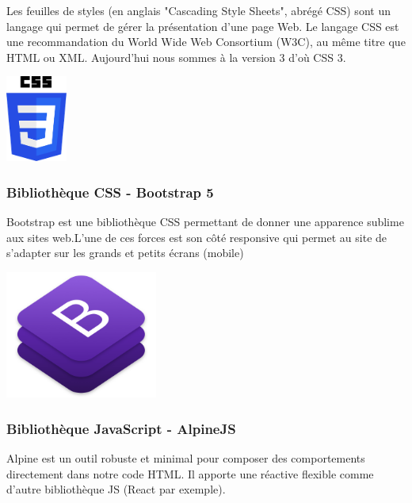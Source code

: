 			Les feuilles de styles (en anglais "Cascading Style Sheets", abrégé CSS) sont un langage qui permet de gérer la présentation d'une page Web. Le langage CSS est une recommandation du World Wide Web Consortium (W3C), au même titre que HTML ou XML. Aujourd'hui nous sommes à la version 3 d'où CSS 3.
				
				\begin{center}
					\includegraphics[width=2cm]{chap_2/css3.png}
					\label{figure6}
				\end{center}
			
			\subsubsection{Bibliothèque CSS - Bootstrap 5}
				
				Bootstrap est une bibliothèque CSS permettant de donner une apparence sublime aux sites web.L'une de ces forces est son côté responsive qui permet au site de s'adapter sur les grands et petits écrans (mobile)
				
				\begin{center}
					\includegraphics[width=5cm]{chap_2/bootstrap.png}
					\label{figure7}
					\cite{logo_bootstrap}
				\end{center}
			
			\subsubsection{Bibliothèque  JavaScript - AlpineJS}
			
			Alpine est un outil robuste et minimal pour composer des comportements directement dans notre code HTML. Il apporte une réactive flexible comme d'autre bibliothèque JS (React par exemple).\\
		
